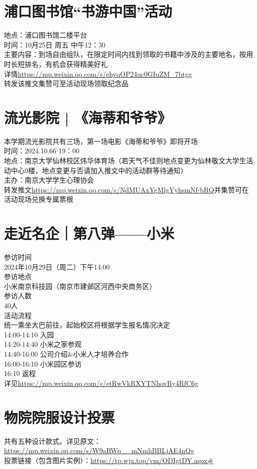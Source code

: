 \documentclass[letterpaper, 12pt]{article}
\begin{document}
\begin{multicols}{2}
\section{浦口图书馆“书游中国”活动}
地点：浦口图书馆二楼平台\\
时间：10月25日 周五 中午12：30\\
主要内容：到场自由组队，在限定时间内找到领取的书籍中涉及的主要地名，按用时长短排名，有机会获得精美好礼\\
详情\url{https://mp.weixin.qq.com/s/ehyqOP24uc0GIuZM_7btgg}\\
转发该推文集赞可至活动现场领取纪念品\\


\section{流光影院 | 《海蒂和爷爷》}
本学期流光影院共有三场，第一场电影《海蒂和爷爷》即将开场\\
时间：2024.10.66 19：00\\
地点：南京大学仙林校区炜华体育场（若天气不佳则地点变更为仙林敬文大学生活动中心9楼，地点变更与否请加入推文中的活动群等待通知）\\
主办：南京大学学生心理协会\\
转发推文\url{https://mp.weixin.qq.com/s/NdMUAxYgMlgYyhsmNf-bRQ}并集赞可在活动现场兑换专属票根\\
\section{走近名企｜第八弹——小米}
参访时间\\
2024年10月29日（周二）下午14:00\\
参访地点\\
小米南京科技园（南京市建邺区河西中央商务区）\\
参访人数\\
40人\\
活动流程\\
统一乘坐大巴前往，起始校区将根据学生报名情况决定\\
14:00-14:10  入园\\
14:20-14:40  小米之家参观\\
14:40-16:00  公司介绍\&小米人才培养合作\\
16:00-16:10  小米园区参访\\
16:10        返程\\
详见\url{https://mp.weixin.qq.com/s/etRwVkRXYTNhovRy4RfC6g}\\
\section{物院院服设计投票}
共有五种设计款式。详见原文：\url{https://mp.weixin.qq.com/s/W9aRWp__mNmhBBLjAE4nQg}\\
投票链接（包含图片实例）：\url{https://tp.wjx.top/vm/ODIgtDY.aspx#}


\end{multicols}
\end{document}
